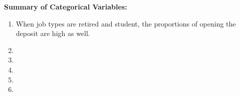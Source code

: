 \documentclass[11pt,a4paper]{article}
\begin{document}
        \begin{figure}[H]
        \centering
    
        
        \qquad
    \end{figure}
    
    
    
    \noindent \textbf{Summary of Categorical Variables:}
    \begin{enumerate}
        \item When job types are retired and student, the proportions of opening the deposit are high as well.
        \item 
        \item
        \item
        \item
        \item
    \end{enumerate}
    
\end{document}
